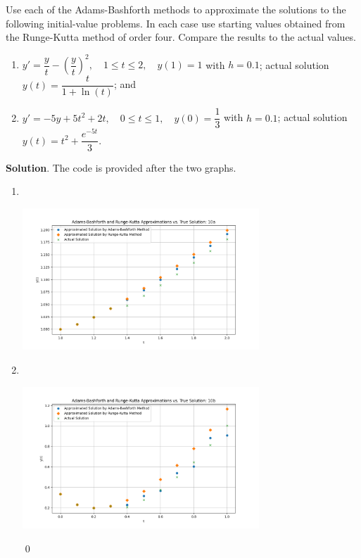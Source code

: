 \documentclass[11pt]{article}
\theoremstyle{break}
\numberwithin{equation}{theorem}
\begin{document}
\newpage
\begin{problem}\label{problem 10} %
    Use each of the Adams-Bashforth methods to approximate the solutions to the following initial-value problems. In each case use starting values obtained from the Runge-Kutta method of order four. Compare the results to the actual values.
    \begin{enumerate}
        \item $y'=\dfrac{y}{t}-\left(\dfrac{y}{t}\right)^2, \quad1\leq t\leq 2, \quad y(1)=1$ with $h=0.1$; actual solution $y(t)=\dfrac{t}{1+\ln(t)}$; and
        \item $y'=-5y+5t^2+2t, \quad 0\leq t\leq 1, \quad y(0)=\dfrac{1}{3}$ with $h=0.1$; actual solution $y(t)=t^2+\dfrac{e^{-5t}}{3}$.
    \end{enumerate}
\end{problem}
\textbf{Solution}. The code is provided after the two graphs.
\begin{enumerate}
    \item $\ $
    \begin{center}
        \includegraphics[width=0.7\textwidth]{P10a.png}
    \end{center}
    \item $\ $
    \begin{center}
        \includegraphics[width=0.7\textwidth]{P10b.png}
    \end{center} \qed
\end{enumerate}
\end{document}
